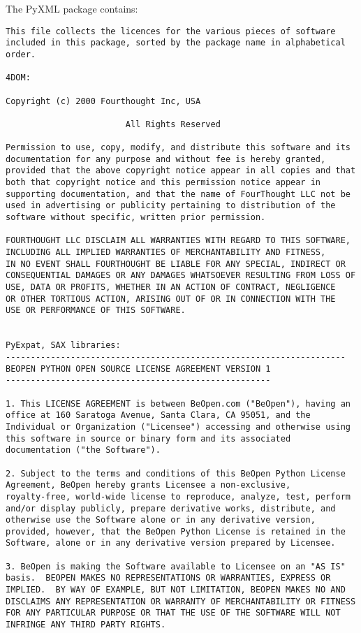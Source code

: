 The PyXML package contains:

\begin{verbatim}
This file collects the licences for the various pieces of software
included in this package, sorted by the package name in alphabetical
order.

4DOM:

Copyright (c) 2000 Fourthought Inc, USA

                        All Rights Reserved

Permission to use, copy, modify, and distribute this software and its
documentation for any purpose and without fee is hereby granted,
provided that the above copyright notice appear in all copies and that
both that copyright notice and this permission notice appear in
supporting documentation, and that the name of FourThought LLC not be
used in advertising or publicity pertaining to distribution of the
software without specific, written prior permission.

FOURTHOUGHT LLC DISCLAIM ALL WARRANTIES WITH REGARD TO THIS SOFTWARE,
INCLUDING ALL IMPLIED WARRANTIES OF MERCHANTABILITY AND FITNESS,
IN NO EVENT SHALL FOURTHOUGHT BE LIABLE FOR ANY SPECIAL, INDIRECT OR
CONSEQUENTIAL DAMAGES OR ANY DAMAGES WHATSOEVER RESULTING FROM LOSS OF
USE, DATA OR PROFITS, WHETHER IN AN ACTION OF CONTRACT, NEGLIGENCE
OR OTHER TORTIOUS ACTION, ARISING OUT OF OR IN CONNECTION WITH THE
USE OR PERFORMANCE OF THIS SOFTWARE.


PyExpat, SAX libraries:
--------------------------------------------------------------------
BEOPEN PYTHON OPEN SOURCE LICENSE AGREEMENT VERSION 1
-----------------------------------------------------

1. This LICENSE AGREEMENT is between BeOpen.com ("BeOpen"), having an
office at 160 Saratoga Avenue, Santa Clara, CA 95051, and the
Individual or Organization ("Licensee") accessing and otherwise using
this software in source or binary form and its associated
documentation ("the Software").

2. Subject to the terms and conditions of this BeOpen Python License
Agreement, BeOpen hereby grants Licensee a non-exclusive,
royalty-free, world-wide license to reproduce, analyze, test, perform
and/or display publicly, prepare derivative works, distribute, and
otherwise use the Software alone or in any derivative version,
provided, however, that the BeOpen Python License is retained in the
Software, alone or in any derivative version prepared by Licensee.

3. BeOpen is making the Software available to Licensee on an "AS IS"
basis.  BEOPEN MAKES NO REPRESENTATIONS OR WARRANTIES, EXPRESS OR
IMPLIED.  BY WAY OF EXAMPLE, BUT NOT LIMITATION, BEOPEN MAKES NO AND
DISCLAIMS ANY REPRESENTATION OR WARRANTY OF MERCHANTABILITY OR FITNESS
FOR ANY PARTICULAR PURPOSE OR THAT THE USE OF THE SOFTWARE WILL NOT
INFRINGE ANY THIRD PARTY RIGHTS.


\end{verbatim}
